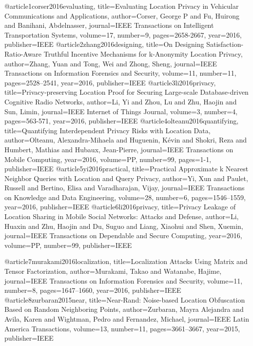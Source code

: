 {{{{{{{{@article{1corser2016evaluating,
  title={Evaluating Location Privacy in Vehicular Communications and Applications},
  author={Corser, George P and Fu, Huirong and Banihani, Abdelnasser},
  journal={IEEE Transactions on Intelligent Transportation Systems},
  volume={17},
  number={9},
  pages={2658-2667},
  year={2016},
  publisher={IEEE}
}
@article{2zhang2016designing,
  title={On Designing Satisfaction-Ratio-Aware Truthful Incentive Mechanisms for k-Anonymity Location Privacy},
  author={Zhang, Yuan and Tong, Wei and Zhong, Sheng},
  journal={IEEE Transactions on Information Forensics and Security},
  volume={11},
  number={11},
  pages={2528--2541},
  year={2016},
  publisher={IEEE}
}
@article{3li2016privacy,
  title={Privacy-preserving Location Proof for Securing Large-scale Database-driven Cognitive Radio Networks},
  author={Li, Yi and Zhou, Lu and Zhu, Haojin and Sun, Limin},
  journal={IEEE Internet of Things Journal},
  volume={3},
  number={4},
  pages={563-571},
  year={2016},
  publisher={IEEE}
}
@article{4olteanu2016quantifying,
  title={Quantifying Interdependent Privacy Risks with Location Data},
  author={Olteanu, Alexandra-Mihaela and Huguenin, K{\'e}vin and Shokri, Reza and Humbert, Mathias and Hubaux, Jean-Pierre},
  journal={IEEE Transactions on Mobile Computing},
  year={2016},
  volume={PP},
  number={99},
  pages={1-1},
  publisher={IEEE}
}
@article{5yi2016practical,
  title={Practical Approximate k Nearest Neighbor Queries with Location and Query Privacy},
  author={Yi, Xun and Paulet, Russell and Bertino, Elisa and Varadharajan, Vijay},
  journal={IEEE Transactions on Knowledge and Data Engineering},
  volume={28},
  number={6},
  pages={1546--1559},
  year={2016},
  publisher={IEEE}
}
@article{6li2016privacy,
  title={Privacy Leakage of Location Sharing in Mobile Social Networks: Attacks and Defense},
  author={Li, Huaxin and Zhu, Haojin and Du, Suguo and Liang, Xiaohui and Shen, Xuemin},
  journal={IEEE Transactions on Dependable and Secure Computing},
  year={2016},
  volume={PP},
  number={99},
  publisher={IEEE}
}

@article{7murakami2016localization,
  title={Localization Attacks Using Matrix and Tensor Factorization},
  author={Murakami, Takao and Watanabe, Hajime},
  journal={IEEE Transactions on Information Forensics and Security},
  volume={11},
  number={8},
  pages={1647--1660},
  year={2016},
  publisher={IEEE}
}
@article{8zurbaran2015near,
  title={Near-Rand: Noise-based Location Obfuscation Based on Random Neighboring Points},
  author={Zurbaran, Mayra Alejandra and Avila, Karen and Wightman, Pedro and Fernandez, Michael},
  journal={IEEE Latin America Transactions},
  volume={13},
  number={11},
  pages={3661--3667},
  year={2015},
  publisher={IEEE}
}

}}}}}}}}
